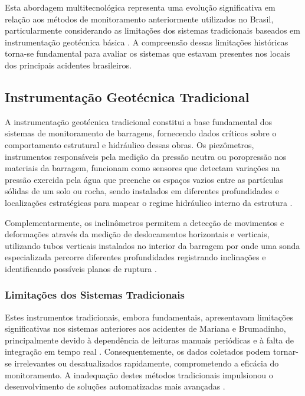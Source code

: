 Esta abordagem multitecnológica representa uma evolução significativa em relação aos métodos de monitoramento anteriormente utilizados no Brasil, particularmente considerando as limitações dos sistemas tradicionais baseados em instrumentação geotécnica básica \cite{mineracaobrasil2024metodos}. A compreensão dessas limitações históricas torna-se fundamental para avaliar os sistemas que estavam presentes nos locais dos principais acidentes brasileiros.

\subsection{Instrumentação Geotécnica Tradicional}

A instrumentação geotécnica tradicional constitui a base fundamental dos sistemas de monitoramento de barragens, fornecendo dados críticos sobre o comportamento estrutural e hidráulico dessas obras. Os piezômetros, instrumentos responsáveis pela medição da pressão neutra ou poropressão nos materiais da barragem, funcionam como sensores que detectam variações na pressão exercida pela água que preenche os espaços vazios entre as partículas sólidas de um solo ou rocha, sendo instalados em diferentes profundidades e localizações estratégicas para mapear o regime hidráulico interno da estrutura \cite{geoscan2024sistema, ltec2024piezometros}.

Complementarmente, os inclinômetros permitem a detecção de movimentos e deformações através da medição de deslocamentos horizontais e verticais, utilizando tubos verticais instalados no interior da barragem por onde uma sonda especializada percorre diferentes profundidades registrando inclinações e identificando possíveis planos de ruptura \cite{ltec2025inclinometros}.

\subsubsection{Limitações dos Sistemas Tradicionais}

Estes instrumentos tradicionais, embora fundamentais, apresentavam limitações significativas nos sistemas anteriores aos acidentes de Mariana e Brumadinho, principalmente devido à dependência de leituras manuais periódicas e à falta de integração em tempo real \cite{anm2019relatorio}. Consequentemente, os dados coletados podem tornar-se irrelevantes ou desatualizados rapidamente, comprometendo a eficácia do monitoramento. A inadequação destes métodos tradicionais impulsionou o desenvolvimento de soluções automatizadas mais avançadas \cite{ibram2020tecnologias}.

